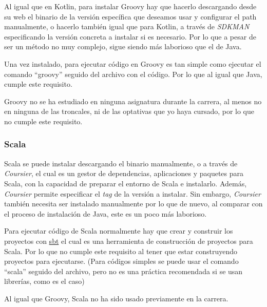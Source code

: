 \begin{todolist}
    \item Al igual que en Kotlin, para instalar Groovy hay que hacerlo
    descargando desde su web el binario de la versión específica que deseamos
    usar y configurar el path manualmente, o hacerlo también igual que para
    Kotlin, a través de \emph{SDKMAN} especificando la versión concreta a
    instalar si es necesario. Por lo que a pesar de ser un método no muy
    complejo, sigue siendo más laborioso que el de Java.
    \item[\xcmark] Una vez instalado, para ejecutar código en Groovy es tan
    simple como ejecutar el comando ``groovy'' seguido del archivo con el
    código. Por lo que al igual que Java, cumple este requisito.
    \item Groovy no se ha estudiado en ninguna asignatura durante la carrera, al
    menos no en ninguna de las troncales, ni de las optativas que yo haya
    cursado, por lo que no cumple este requisito.
\end{todolist}

\subsubsection{Scala}

\begin{todolist}
    \item Scala se puede instalar descargando el binario manualmente, o a través
    de \emph{Coursier}, el cual es un gestor de dependencias, aplicaciones y
    paquetes para Scala, con la capacidad de preparar el entorno de
    Scala e instalarlo. Además, \emph{Coursier} permite especificar el \emph{tag} de la
    versión a instalar. Sin embargo, \emph{Coursier} también necesita ser
    instalado manualmente por lo que de nuevo, al comparar con el proceso de
    instalación de Java, este es un poco más laborioso.
    \item Para ejecutar código de Scala normalmente hay que crear y construir
    los proyectos con \href{https://www.scala-sbt.org/}{sbt} el cual es una
    herramienta de construcción de proyectos para Scala. Por lo que no cumple
    este requisito al tener que estar construyendo proyectos para ejecutarse.
    (Para códigos simples se puede usar el comando ``scala'' seguido del
    archivo, pero no es una práctica recomendada si se usan librerías, como es
    el caso)
    \item Al igual que Groovy, Scala no ha sido usado previamente en la carrera.
\end{todolist}


